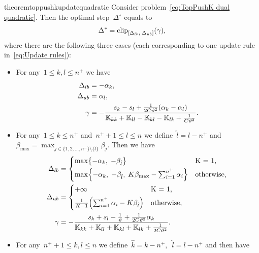 \begin{restatable}{theorem}{toppushkupdatequadratic}\label{thm:Update rule TopPushK with quadratic loss}
  Consider problem~\eqref{eq:TopPushK dual quadratic}. Then the optimal step~$\Delta^\star$ equals to
  \begin{equation}\label{eq:Optimal delta}
    \Delta^{*} = \clip{\Delta_{lb}}{\Delta_{ub}}{\gamma},
  \end{equation}
  where there are the following three cases (each corresponding to one update rule in~\eqref{eq:Update rules}):
  \begin{itemize}
    \item For any~$1\le k, l \le n^+$ we have
    \begin{align*}
      \Delta_{lb} & = -\alpha_k, \\
      \Delta_{ub} & = \alpha_l, \\
      \gamma      & = -\frac{s_k - s_l + \frac{1}{2C\vartheta^2}(\alpha_k - \alpha_l)}{\mathbb{K}_{kk} + \mathbb{K}_{ll} - \mathbb{K}_{kl} - \mathbb{K}_{lk} + \frac{1}{C\vartheta^2}}.
    \end{align*}
    \item For any~$1 \le k \le n^+$ and~$n^+ + 1 \le l \le n$ we define~$\hat{l} = l - n^+$  and~$\beta_{\max} = \max_{j \in \{1, 2, \ldots, n^- \} \setminus \{\hat l\}} \beta_j.$ Then we have
    \begin{align*}
      \Delta_{lb} & = 
        \begin{cases*}
          \max \Brac[c]{- \alpha_k,\;  -\beta_{\hat l}} & K = 1, \\
          \max \Brac[c]{- \alpha_k,\;  -\beta_{\hat l}, \; K\beta_{\max} - \sum_{i = 1}^{n^+} \alpha_i} & \textrm{otherwise},
        \end{cases*} \\
      \Delta_{ub} & = 
        \begin{cases*}
          + \infty & K = 1, \\
          \frac{1}{K-1}\Brac{\sum_{i = 1}^{n^+} \alpha_i - K \beta_{\hat l}} & \textrm{otherwise},
        \end{cases*} \\
      \gamma & = -\frac{s_k + s_l - \frac{1}{\vartheta} + \frac{1}{2C\vartheta^2} \alpha_k}{\K_{kk} + \K_{ll} + \K_{kl} + \K_{lk} + \frac{1}{2C\vartheta^2}}.
    \end{align*}
    \item For any~$n^+ + 1\le k,l \le n$ we define~$\hat{k} = k - n^+,$~$\hat{l} = l - n^+$ and then  have

\end{itemize}
\end{restatable}
